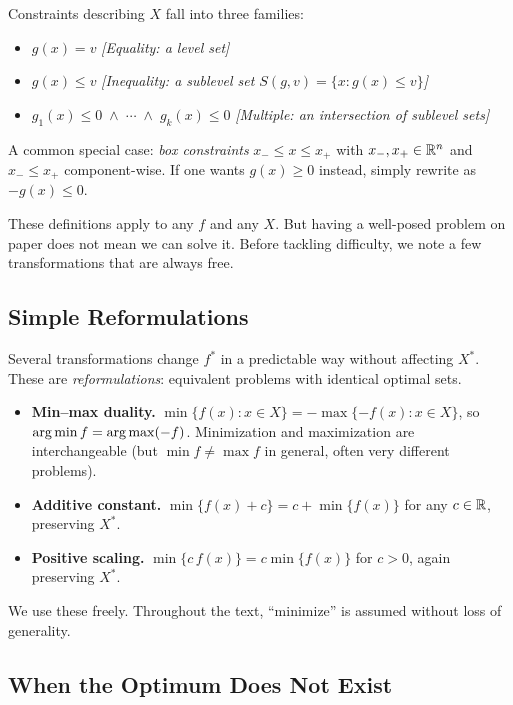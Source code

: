 \begin{definition}\label{def:constraint-types}
	Constraints describing $X$ fall into three families:
	\begin{itemize}
		\item $g(x) = v$ \hfill\textit{[Equality: a level set]}
		\item $g(x) \leq v$ \hfill\textit{[Inequality: a sublevel set $S(g, v) = \{x : g(x) \leq v\}$]}
		\item $g_1(x) \leq 0 \;\land\; \cdots \;\land\; g_k(x) \leq 0$
			\hfill\textit{[Multiple: an intersection of sublevel sets]}
	\end{itemize}
	A common special case: \emph{box constraints} $x_- \leq x \leq x_+$ with $x_-, x_+ \in \mathbb{R}^n$ and $x_- \leq x_+$ component-wise.
	If one wants $g(x) \geq 0$ instead, simply rewrite as $-g(x) \leq 0$.
\end{definition}

These definitions apply to any $f$ and any $X$.
But having a well-posed problem on paper does not mean we can solve it.
Before tackling difficulty, we note a few transformations that are always free.

\subsection{Simple Reformulations}\label{sec:reformulations}

Several transformations change $f^*$ in a predictable way without affecting $X^*$.
These are \emph{reformulations}: equivalent problems with identical optimal sets.

\begin{itemize}
	\item \textbf{Min--max duality.}
		$\min\{f(x) : x \in X\} = -\max\{-f(x) : x \in X\}$,
		so $\operatorname*{arg\,min} f = \operatorname*{arg\,max}(-f)$.
		Minimization and maximization are interchangeable (but $\min f \neq \max f$ in general, often very different problems).
	\item \textbf{Additive constant.}
		$\min\{f(x) + c\} = c + \min\{f(x)\}$ for any $c \in \mathbb{R}$, preserving $X^*$.
	\item \textbf{Positive scaling.}
		$\min\{c\, f(x)\} = c \min\{f(x)\}$ for $c > 0$, again preserving $X^*$.
\end{itemize}

We use these freely.
Throughout the text, ``minimize'' is assumed without loss of generality.

\subsection{When the Optimum Does Not Exist}\label{sec:unbounded}

